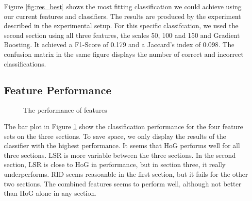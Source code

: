 Figure \ref{fig:res_best} shows the most fitting classification we could achieve using our current features and classifiers. The results are produced by the experiment described in the experimental setup. For this specific classifcation, we used the second section using all three features, the scales 50, 100 and 150 and Gradient Boosting. It achieved a F1-Score of 0.179 and a Jaccard's index of 0.098. The confusion matrix in the same figure displays the number of correct and incorrect classifications.

\subsection{Feature Performance}

\datazero

\begin{figure}
	\caption{The performance of features}
	\label{fig:res_bar_0}
\end{figure}

The bar plot in Figure \ref{fig:res_bar_0} show the classification performance for the four feature sets on the three sections. To save space, we only display the results of the classifier with the highest performance.
It seems that HoG performs well for all three sections. LSR is more variable between the three sections. In the second section, LSR is close to HoG in performance, but in section three, it really underperforms. RID seems reasoanble in the first section, but it fails for the other two sections. The combined features seems to perform well, although not better than HoG alone in any section.


